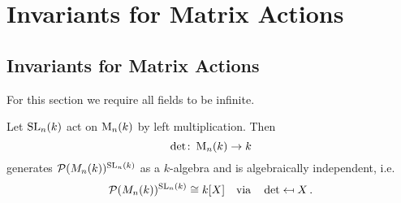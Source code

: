 \chapter{Invariants for Matrix Actions}





\section{Invariants for Matrix Actions}
For this section we require all fields to be infinite.


\begin{thrm}
  Let $\operatorname{SL}_n(k)$ act on $\operatorname{M}_n(k)$ by left multiplication. Then
  \[
            \det
    \colon  \operatorname{M}_n(k)
    \to     k
  \]
  generates $\mathcal{P}(M_n(k))^{\operatorname{SL}_n(k)}$ as a $k$-algebra and is algebraically independent, i.e.\
  \[
              \mathcal{P}(M_n(k))^{\operatorname{SL}_n(k)}
    \cong     k[X]
    \quad\text{via}\quad
              \det
    \mapsfrom X \,.
  \]
\end{thrm}
